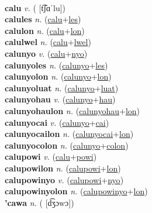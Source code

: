  \label{cayniki} \\
\textbf{calu} \textit{v.} ( [t͡ʃɑˈlu])
 \label{calu} \\
\textbf{calules} \textit{n.} (\hyperref[calu]{calu}+\hyperref[les]{les})
 \label{calules} \\
\textbf{calulon} \textit{n.} (\hyperref[calu]{calu}+\hyperref[lon]{lon})
 \label{calulon} \\
\textbf{calulwel} \textit{n.} (\hyperref[calu]{calu}+\hyperref[lwel]{lwel})
 \label{calulwel} \\
\textbf{calunyo} \textit{v.} (\hyperref[calu]{calu}+\hyperref[nyo]{nyo})
 \label{calunyo} \\
\textbf{calunyoles} \textit{n.} (\hyperref[calunyo]{calunyo}+\hyperref[les]{les})
 \label{calunyoles} \\
\textbf{calunyolon} \textit{n.} (\hyperref[calunyo]{calunyo}+\hyperref[lon]{lon})
 \label{calunyolon} \\
\textbf{calunyoluat} \textit{n.} (\hyperref[calunyo]{calunyo}+\hyperref[luat]{luat})
 \label{calunyoluat} \\
\textbf{calunyohau} \textit{v.} (\hyperref[calunyo]{calunyo}+\hyperref[hau]{hau})
 \label{calunyohau} \\
\textbf{calunyohaulon} \textit{n.} (\hyperref[calunyohau]{calunyohau}+\hyperref[lon]{lon})
 \label{calunyohaulon} \\
\textbf{calunyocai} \textit{v.} (\hyperref[calunyo]{calunyo}+\hyperref[cai]{cai})
 \label{calunyocai} \\
\textbf{calunyocailon} \textit{n.} (\hyperref[calunyocai]{calunyocai}+\hyperref[lon]{lon})
 \label{calunyocailon} \\
\textbf{calunyocolon} \textit{n.} (\hyperref[calunyo]{calunyo}+\hyperref[colon]{colon})
 \label{calunyocolon} \\
\textbf{calupowi} \textit{v.} (\hyperref[calu]{calu}+\hyperref[powi]{powi})
 \label{calupowi} \\
\textbf{calupowilon} \textit{n.} (\hyperref[calupowi]{calupowi}+\hyperref[lon]{lon})
 \label{calupowilon} \\
\textbf{calupowinyo} \textit{v.} (\hyperref[calupowi]{calupowi}+\hyperref[nyo]{nyo})
 \label{calupowinyo} \\
\textbf{calupowinyolon} \textit{n.} (\hyperref[calupowinyo]{calupowinyo}+\hyperref[lon]{lon})
 \label{calupowinyolon} \\
\textbf{'cawa} \textit{n.} ( [d͡ʒɔwɔ])
 \label{'cawa} \\
